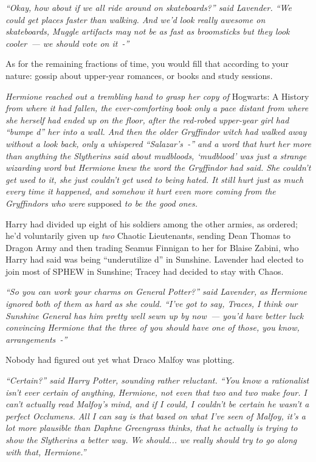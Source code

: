 \emph{``Okay, how about if we all ride around on skateboards?'' said Lavender. ``We could get places faster than walking. And we'd look really awesome on skateboards, Muggle artifacts may not be as fast as broomsticks but they look cooler~--- we should vote on it~-''}

As for the remaining fractions of time, you would fill that according to your nature: gossip about upper-year romances, or books and study sessions.

\emph{Hermione reached out a trembling hand to grasp her copy of} Hogwarts: A History \emph{from where it had fallen, the ever-comforting book only a pace distant from where she herself had ended up on the floor, after the red-robed upper-year girl had ``bumpe d'' her into a wall. And then the older Gryffindor witch had walked away without a look back, only a whispered ``Salazar's~-'' and a word that hurt her more than anything the Slytherins said about mudbloods, `mudblood' was just a strange wizarding word but Hermione knew the word the Gryffindor had said. She couldn't get used to it, she just couldn't get used to being hated. It still hurt just as much every time it happened, and somehow it hurt even more coming from the Gryffindors who were} supposed \emph{to be the good ones.}

Harry had divided up eight of his soldiers among the other armies, as ordered; he'd voluntarily given up \emph{two} Chaotic Lieutenants, sending Dean Thomas to Dragon Army and then trading Seamus Finnigan to her for Blaise Zabini, who Harry had said was being ``underutilize d'' in Sunshine. Lavender had elected to join most of SPHEW in Sunshine; Tracey had decided to stay with Chaos.

\emph{``So you can work your charms on General Potter?'' said Lavender, as Hermione ignored both of them as hard as she could. ``I've got to say, Traces, I think our Sunshine General has him pretty well sewn up by now~--- you'd have better luck convincing Hermione that the three of you should have one of those, you know, arrangements~-''}

Nobody had figured out yet what Draco Malfoy was plotting.

\emph{``Certain?'' said Harry Potter, sounding rather reluctant. ``You know a rationalist isn't ever certain of anything, Hermione, not even that two and two make four. I can't actually read Malfoy's mind, and if I could, I couldn't be certain he wasn't a perfect Occlumens. All I can say is that based on what I've seen of Malfoy, it's a lot more plausible than Daphne Greengrass thinks, that he actually is trying to show the Slytherins a better way. We should... we really should try to go along with that, Hermione.''}

